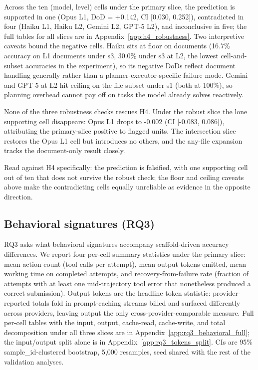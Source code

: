 \documentclass[10pt]{article} %
\begin{document}
            Across the ten (model, level) cells under the primary slice, the prediction is supported in one (Opus L1, DoD = +0.142, CI [0.030, 0.252]), contradicted in four (Haiku L1, Haiku L2, Gemini L2, GPT-5 L2), and inconclusive in five; the full tables for all slices are in Appendix~\ref{app:h4_robustness}. Two interpretive caveats bound the negative cells. Haiku sits at floor on documents (16.7\% accuracy on L1 documents under s3, 30.0\% under s3 at L2, the lowest cell-and-subset accuracies in the experiment), so its negative DoDs reflect document handling generally rather than a planner-executor-specific failure mode. Gemini and GPT-5 at L2 hit ceiling on the file subset under s1 (both at 100\%), so planning overhead cannot pay off on tasks the model already solves reactively.
            
            None of the three robustness checks rescues H4. Under the robust slice the lone supporting cell disappears: Opus L1 drops to -0.002 (CI [-0.083, 0.086]), attributing the primary-slice positive to flagged units. The intersection slice restores the Opus L1 cell but introduces no others, and the any-file expansion tracks the document-only result closely.
            
            Read against H4 specifically: the prediction is falsified, with one supporting cell out of ten that does not survive the robust check; the floor and ceiling caveats above make the contradicting cells equally unreliable as evidence in the opposite direction.
            
    \subsection{Behavioral signatures (RQ3)}\label{sec:rq3}

        RQ3 asks what behavioral signatures accompany scaffold-driven accuracy differences. We report four per-cell summary statistics under the primary slice: mean action count (tool calls per attempt), mean output tokens emitted, mean working time on completed attempts, and recovery-from-failure rate (fraction of attempts with at least one mid-trajectory tool error that nonetheless produced a correct submission). Output tokens are the headline token statistic: provider-reported totals fold in prompt-caching streams billed and surfaced differently across providers, leaving output the only cross-provider-comparable measure. Full per-cell tables with the input, output, cache-read, cache-write, and total decomposition under all three slices are in Appendix~\ref{app:rq3_behavioral_full}; the input/output split alone is in Appendix~\ref{app:rq3_tokens_split}. CIs are 95\% sample\_id-clustered bootstrap, 5{,}000 resamples, seed shared with the rest of the validation analyses.
        
\end{document}
